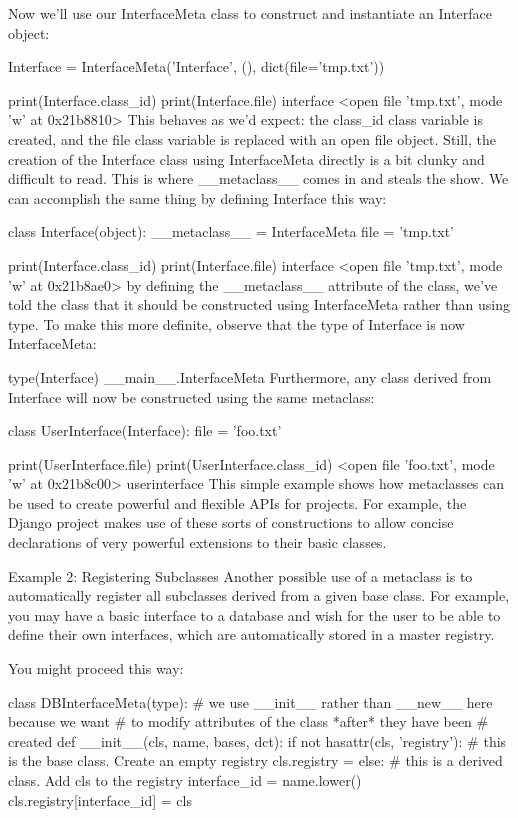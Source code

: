 Now we'll use our InterfaceMeta class to construct and instantiate an Interface object:

Interface = InterfaceMeta('Interface', (), dict(file='tmp.txt'))

print(Interface.class_id)
print(Interface.file)
interface
<open file 'tmp.txt', mode 'w' at 0x21b8810>
This behaves as we'd expect: the class_id class variable is created, and the file class variable is replaced with an open file object. Still, the creation of the Interface class using InterfaceMeta directly is a bit clunky and difficult to read. This is where __metaclass__ comes in and steals the show. We can accomplish the same thing by defining Interface this way:

class Interface(object):
    __metaclass__ = InterfaceMeta
    file = 'tmp.txt'

print(Interface.class_id)
print(Interface.file)
interface
<open file 'tmp.txt', mode 'w' at 0x21b8ae0>
by defining the __metaclass__ attribute of the class, we've told the class that it should be constructed using InterfaceMeta rather than using type. To make this more definite, observe that the type of Interface is now InterfaceMeta:

type(Interface)
__main__.InterfaceMeta
Furthermore, any class derived from Interface will now be constructed using the same metaclass:

class UserInterface(Interface):
    file = 'foo.txt'

print(UserInterface.file)
print(UserInterface.class_id)
<open file 'foo.txt', mode 'w' at 0x21b8c00>
userinterface
This simple example shows how metaclasses can be used to create powerful and flexible APIs for projects. For example, the Django project makes use of these sorts of constructions to allow concise declarations of very powerful extensions to their basic classes.

Example 2: Registering Subclasses
Another possible use of a metaclass is to automatically register all subclasses derived from a given base class. For example, you may have a basic interface to a database and wish for the user to be able to define their own interfaces, which are automatically stored in a master registry.

You might proceed this way:

class DBInterfaceMeta(type):
    # we use __init__ rather than __new__ here because we want
    # to modify attributes of the class *after* they have been
    # created
    def __init__(cls, name, bases, dct):
        if not hasattr(cls, 'registry'):
            # this is the base class.  Create an empty registry
            cls.registry = {}
        else:
            # this is a derived class.  Add cls to the registry
            interface_id = name.lower()
            cls.registry[interface_id] = cls

